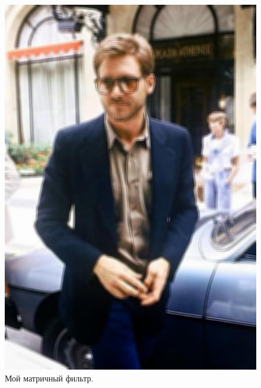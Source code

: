 \documentclass[a4paper,12pt]{article}
\begin{document}
\begin{figure}[h]
\begin{center}
\begin{minipage}[h]{0.3\linewidth}
\includegraphics[width=1\linewidth]{Pic_matrix_MyMatrixFilter}
Мой матричный фильтр.
\end{minipage}
\end{center}

\end{figure}

\end{document}
